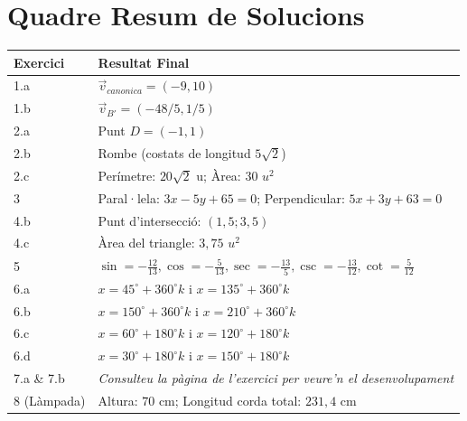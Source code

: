 \documentclass[12pt,a4paper,answers]{exam} %
\begin{document}
\section*{Quadre Resum de Solucions}
\begin{center}
\renewcommand{\arraystretch}{1.5}
\begin{tabular}{|l|l|}
    \hline
    \textbf{Exercici} & \textbf{Resultat Final} \\ \hline
    1.a & $\vec{v}_{canonica} = (-9, 10)$ \\ \hline
    1.b & $\vec{v}_{B'} = (-48/5, 1/5)$ \\ \hline
    2.a & Punt $D = (-1, 1)$ \\ \hline
    2.b & Rombe (costats de longitud $5\sqrt{2}$) \\ \hline
    2.c & Perímetre: $20\sqrt{2}$ u; Àrea: $30$ $u^2$ \\ \hline
    3 & Paral·lela: $3x-5y+65=0$; Perpendicular: $5x+3y+63=0$ \\ \hline
    4.b & Punt d'intersecció: $(1,5 ; 3,5)$ \\ \hline
    4.c & Àrea del triangle: $3,75$ $u^2$ \\ \hline
    5 & $\sin = -\frac{12}{13}, \cos = -\frac{5}{13}, \sec = -\frac{13}{5}, \csc = -\frac{13}{12}, \cot = \frac{5}{12}$ \\ \hline
    6.a & $x = 45^\circ + 360^\circ k$ i $x = 135^\circ + 360^\circ k$ \\ \hline
    6.b & $x = 150^\circ + 360^\circ k$ i $x = 210^\circ + 360^\circ k$ \\ \hline
    6.c & $x = 60^\circ + 180^\circ k$ i $x = 120^\circ + 180^\circ k$ \\ \hline
    6.d & $x = 30^\circ + 180^\circ k$ i $x = 150^\circ + 180^\circ k$ \\ \hline
    7.a \& 7.b & \textit{Consulteu la pàgina de l'exercici per veure'n el desenvolupament} \\ \hline
    8 (Làmpada) & Altura: $70$ cm; Longitud corda total: $231,4$ cm \\ \hline
\end{tabular}
\end{center}
\end{document}
